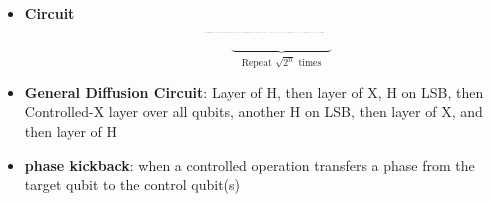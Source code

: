 \begin{multicols}{3}
\begin{itemize}[leftmargin=*,nosep,topsep=0pt]
                    \item \textbf{Circuit}
                      \[
                        \resizebox{0.25\textwidth}{!}{
                          \begin{quantikz}
                            \lstick{$q_{n - 1}$} & \gate{H} & \gate[5]{\shortstack{$f(x)$ \\ Oracle}} & \qw & \gate[5]{\text{Diffusion Circuit}} & \meter{} \\
                            \lstick{$q_{n - 2}$} & \gate{H} & & & & \meter{} \\
                            \vdots & \vdots & & \vdots & & \vdots \\
                            \lstick{$q_1$} & \gate{H} & & & & \meter{} \\
                            \lstick{$q_0$} & \gate{H} & & & & \meter{}
                          \end{quantikz}
                        }
                      \]

                      \[
                        \hspace{1cm}
                        \underbrace{\hspace{3cm}}_{\text{Repeat } \sqrt{2^n} \text{ times}}
                      \]

                    \item \textbf{General Diffusion Circuit}: Layer of H, then layer of X, H on LSB, then Controlled-X
                      layer over all qubits, another H on LSB, then layer of X, and
                      then layer of H

                    \item \textbf{phase kickback}: when a controlled
                      operation transfers a phase from the target qubit to
                      the control qubit(s)
                  \end{itemize}


\end{multicols}
